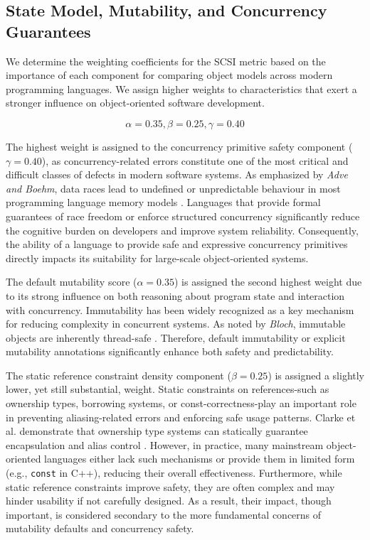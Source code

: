 \subsection{State Model, Mutability, and Concurrency Guarantees}

We determine the weighting coefficients for the SCSI metric based on the importance of each component for comparing object models across modern programming languages. We assign higher weights to characteristics that exert a stronger influence on object-oriented software development.

\[
    \alpha = 0.35, \beta = 0.25, \gamma = 0.40
\]

The highest weight is assigned to the concurrency primitive safety component ($\gamma = 0.40$), as concurrency-related errors constitute one of the most critical and difficult classes of defects in modern software systems. As emphasized by \textit{Adve and Boehm}, data races lead to undefined or unpredictable behaviour in most programming language memory models \cite{boehm2008foundations}. Languages that provide formal guarantees of race freedom or enforce structured concurrency significantly reduce the cognitive burden on developers and improve system reliability. Consequently, the ability of a language to provide safe and expressive concurrency primitives directly impacts its suitability for large-scale object-oriented systems.

The default mutability score ($\alpha = 0.35$) is assigned the second highest weight due to its strong influence on both reasoning about program state and interaction with concurrency. Immutability has been widely recognized as a key mechanism for reducing complexity in concurrent systems. As noted by \textit{Bloch}, immutable objects are inherently thread-safe \cite{bloch2017effective}. Therefore, default immutability or explicit mutability annotations significantly enhance both safety and predictability.

The static reference constraint density component ($\beta = 0.25$) is assigned a slightly lower, yet still substantial, weight. Static constraints on references-such as ownership types, borrowing systems, or const-correctness-play an important role in preventing aliasing-related errors and enforcing safe usage patterns. Clarke et al. demonstrate that ownership type systems can statically guarantee encapsulation and alias control \cite{clarke1998ownership}. However, in practice, many mainstream object-oriented languages either lack such mechanisms or provide them in limited form (e.g., \texttt{const} in C++), reducing their overall effectiveness. Furthermore, while static reference constraints improve safety, they are often complex and may hinder usability if not carefully designed. As a result, their impact, though important, is considered secondary to the more fundamental concerns of mutability defaults and concurrency safety.



